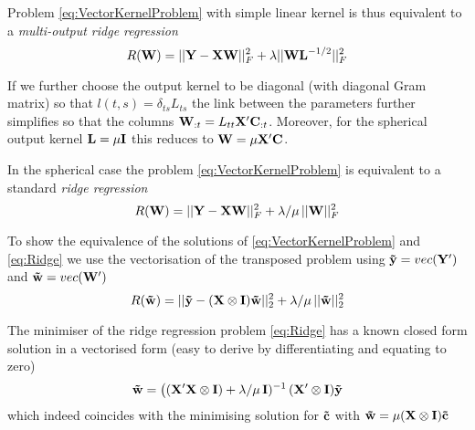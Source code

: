 Problem \eqref{eq:VectorKernelProblem} with simple linear kernel is thus equivalent to a \emph{multi-output ridge regression}
\begin{equation}\label{eq:VectorRidge}
R(\mathbf{W}) = ||\mathbf{Y} - \mathbf{XW}||_F^2 + \lambda ||\mathbf{WL}^{-1/2}||_F^2
\end{equation}

If we further choose the output kernel to be diagonal (with diagonal Gram matrix) so that $l(t,s) = \delta_{ts} L_{ts}$ the link between the parameters further simplifies so that the columns $\mathbf{W}_{:t} = L_{tt} \mathbf{X'C}_{:t}$.
Moreover, for the spherical output kernel $\mathbf{L} = \mu \mathbf{I}$ this reduces to $\mathbf{W} = \mu \mathbf{X'C}$.

In the spherical case 
the problem \eqref{eq:VectorKernelProblem} is equivalent to a standard \emph{ridge regression}
\begin{equation}\label{eq:Ridge}
R(\mathbf{W}) = ||\mathbf{Y} - \mathbf{XW}||_F^2 + \lambda/\mu \,
||\mathbf{W}||_F^2
\end{equation}

To show the equivalence of the solutions of \eqref{eq:VectorKernelProblem} and \eqref{eq:Ridge} we use the vectorisation of the transposed problem using $\mathbf{\tilde{y}} = vec(\mathbf{Y}')$ and $\mathbf{\tilde{w}} = vec(\mathbf{W}')$
\begin{equation}\label{eq:VecVectorRidge}
R(\mathbf{\tilde{w}}) = ||\mathbf{\tilde{y}} - (\mathbf{X} \otimes \mathbf{I}) \mathbf{\tilde{w}}||_2^2 + \lambda/\mu \,
||\mathbf{\tilde{w}}||_2^2
\end{equation}

The minimiser of the ridge regression problem \eqref{eq:Ridge} has a known closed
form solution in a vectorised form (easy to derive by differentiating and equating to zero)
\begin{equation}\label{eq:VectorWSolution}
 \mathbf{\tilde{w}} = \big( (\mathbf{X'X} \otimes \mathbf{I}) + \lambda/\mu \, \mathbf{I})^{-1} \, (\mathbf{X'} \otimes \mathbf{I}) \mathbf{\tilde{y}}
\end{equation} 
which indeed coincides with the minimising solution for $\mathbf{\tilde{c}}$ with $\mathbf{\tilde{w}} = \mu (\mathbf{X} \otimes \mathbf{I}) \mathbf{\tilde{c}}$

